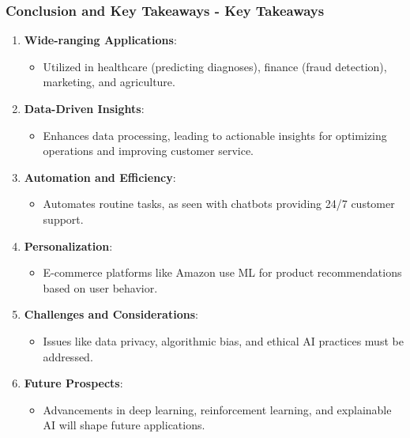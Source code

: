 \documentclass{beamer}
\begin{document}
\begin{frame}[fragile]
    \frametitle{Conclusion and Key Takeaways - Key Takeaways}
    \begin{enumerate}
        \item \textbf{Wide-ranging Applications}:
        \begin{itemize}
            \item Utilized in healthcare (predicting diagnoses), finance (fraud detection), marketing, and agriculture.
        \end{itemize}
        
        \item \textbf{Data-Driven Insights}:
        \begin{itemize}
            \item Enhances data processing, leading to actionable insights for optimizing operations and improving customer service.
        \end{itemize}
        
        \item \textbf{Automation and Efficiency}:
        \begin{itemize}
            \item Automates routine tasks, as seen with chatbots providing 24/7 customer support.
        \end{itemize}

        \item \textbf{Personalization}:
        \begin{itemize}
            \item E-commerce platforms like Amazon use ML for product recommendations based on user behavior.
        \end{itemize}
        
        \item \textbf{Challenges and Considerations}:
        \begin{itemize}
            \item Issues like data privacy, algorithmic bias, and ethical AI practices must be addressed.
        \end{itemize}
        
        \item \textbf{Future Prospects}:
        \begin{itemize}
            \item Advancements in deep learning, reinforcement learning, and explainable AI will shape future applications.
        \end{itemize}
    \end{enumerate}
\end{frame}
\end{document}
